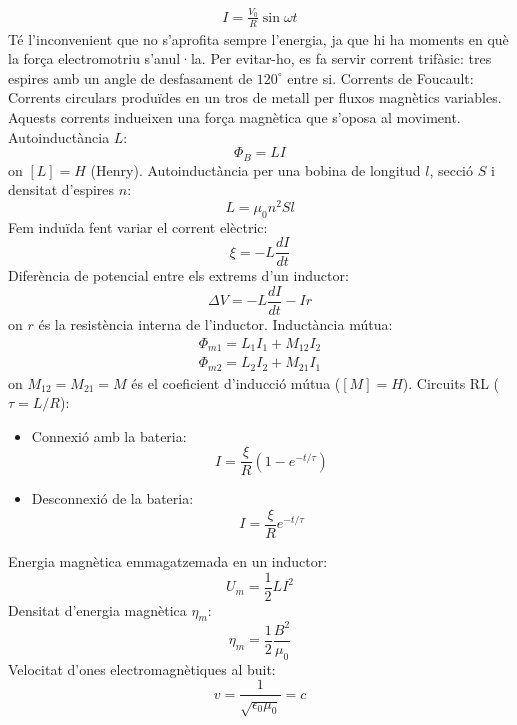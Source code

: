 \documentclass[../../../main.tex]{subfiles}
\begin{document}
\begin{multicols}{2}
\begin{gather*}
    I=\frac{V_0}{R}\sin\omega t
\end{gather*}
{Té l’inconvenient que no s’aprofita sempre l’energia, ja que hi ha moments en què la força electromotriu s’anul·la. Per evitar-ho, es fa servir corrent trifàsic: tres espires amb un angle de desfasament de $120^\circ$ entre si.}\newline
Corrents de Foucault: Corrents circulars produïdes en un tros de metall per fluxos magnètics variables. Aquests corrents indueixen una força magnètica que s’oposa al moviment.\newline
Autoinductància $L$:
$$\Phi_B=LI$$ {on $[L]=H$ (Henry).}\newline
Autoinductància per una bobina de longitud $l$, secció $S$ i densitat d'espires $n$: $$L=\mu_0n^2Sl$$
Fem induïda fent variar el corrent elèctric: $$\xi=-L\frac{dI}{dt}$$
Diferència de potencial entre els extrems d'un inductor: $$\Delta V=-L\frac{dI}{dt}-Ir$$ {on $r$ és la resistència interna de l'inductor.}\newline
Inductància mútua:
\begin{gather*}
    \Phi_{m1}=L_1I_1+M_{12}I_2\\
    \Phi_{m2}=L_2I_2+M_{21}I_1
\end{gather*}
{on $M_{12}=M_{21}=M$ és el coeficient d'inducció mútua ($[M]=H$).}\newline
Circuits RL ($\tau=L/R$):
\begin{itemize}
    \item Connexió amb la bateria: $$I=\frac{\xi}{R}(1-e^{-t/\tau})$$
    \item Desconnexió de la bateria: $$I=\frac{\xi}{R}e^{-t/\tau}$$
\end{itemize}
Energia magnètica emmagatzemada en un inductor: $$U_m=\frac{1}{2}LI^2$$
Densitat d'energia magnètica $\eta_m$: $$\eta_m=\frac{1}{2}\frac{B^2}{\mu_0}$$
Velocitat d'ones electromagnètiques al buit: $$v=\frac{1}{\sqrt{\epsilon_0\mu_0}}=c$$
\end{multicols}
\end{document}
